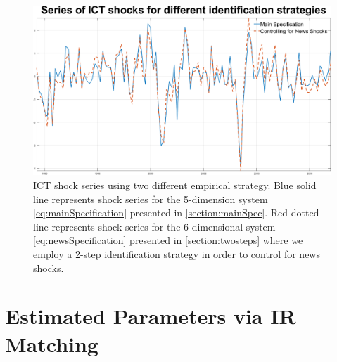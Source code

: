 \documentclass[12pt]{article}
\begin{document}
 	\begin{figure}[h!]
	\begin{center}
		\includegraphics[scale=0.35]{MainFigures/ICTshocksSeries_ControllingforNEWS}
		\caption{ICT shock series using two different empirical strategy. Blue solid line represents shock series for the 5-dimension system \ref{eq:mainSpecification} presented in \ref{section:mainSpec}. Red dotted line represents shock series for the 6-dimensional system \ref{eq:newsSpecification} presented in \ref{section:twosteps} where we employ a 2-step identification strategy in order to control for news shocks.}
		\label{fig:shockSeries_2steps}
	\end{center} 
\end{figure}

\newpage

\section{Estimated Parameters via IR Matching}
\end{document}
